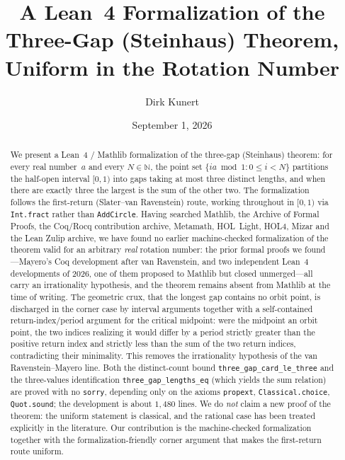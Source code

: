 \documentclass[11pt,reqno]{amsart}
\title[A Lean 4 Formalization of the Three-Gap Theorem]{%
  A Lean~4 Formalization of the Three-Gap (Steinhaus) Theorem,
  Uniform in the Rotation Number}
\author{Dirk Kunert}
\date{September 1, 2026}
\theoremstyle{plain}
\theoremstyle{definition}
\theoremstyle{remark}
\newcommand{\N}{\mathbb{N}}
\newcommand{\code}[1]{\texttt{#1}}
\begin{document}
\begin{abstract}
We present a Lean~4 / Mathlib formalization of the three-gap (Steinhaus)
theorem: for every real number~$a$ and every $N\in\N$, the point set
$\{ia \bmod 1 : 0 \le i < N\}$ partitions the half-open interval $[0,1)$ into
gaps taking at most three distinct lengths, and when there are exactly three
the largest is the sum of the other two.  The formalization follows the
first-return (Slater--van Ravenstein) route, working throughout in $[0,1)$
via \code{Int.fract} rather than \code{AddCircle}.  Having searched Mathlib,
the Archive of Formal Proofs, the Coq/Rocq contribution archive, Metamath,
HOL~Light, HOL4, Mizar and the Lean Zulip archive, we have found no earlier
machine-checked formalization of the theorem valid for an arbitrary
\emph{real} rotation number: the prior formal proofs we found---Mayero's Coq
development after van Ravenstein, and two independent Lean~4 developments of
2026, one of them proposed to Mathlib but closed unmerged---all carry an
irrationality hypothesis, and the theorem remains absent from Mathlib at the
time of writing.  The geometric crux, that the longest gap contains no orbit
point, is discharged in the corner case by interval arguments together with a
self-contained return-index/period argument for the critical midpoint: were
the midpoint an orbit point, the two
indices realizing it would differ by a period strictly greater than the
positive return index and strictly less than the sum of the two return indices,
contradicting their minimality.  This removes the irrationality
hypothesis of the van Ravenstein--Mayero line.  Both the distinct-count bound
\code{three\_gap\_card\_le\_three} and the three-values identification
\code{three\_gap\_lengths\_eq} (which yields the sum relation) are proved with
no \code{sorry}, depending only on
the axioms \code{propext}, \code{Classical.choice}, \code{Quot.sound}; the
development is about $1{,}480$ lines.  We do \emph{not} claim a new proof
of the theorem: the uniform statement is classical, and the rational case has
been treated explicitly in the literature.  Our contribution is the
machine-checked formalization together with the formalization-friendly corner
argument that makes the first-return route uniform.
\end{abstract}

\maketitle

\end{document}

